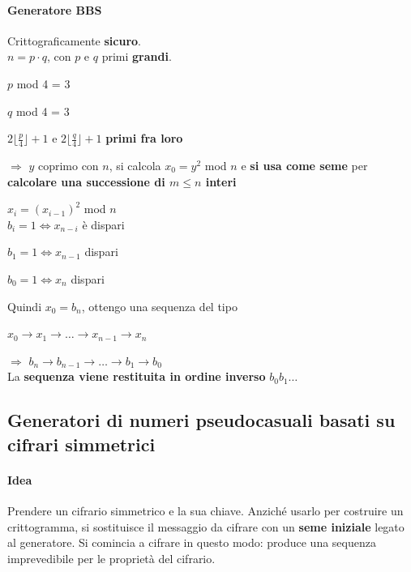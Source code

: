 \documentclass[10pt]{book}
\begin{document}
\paragraph{Generatore BBS} Crittograficamente \textbf{sicuro}.\\
$n = p\cdot q$, con $p$ e $q$ primi \textbf{grandi}.
\begin{list}{}{}
	\item $p$ mod 4 = 3
	\item $q$ mod 4 = 3
	\item $2\lfloor \frac{p}{4}\rfloor + 1$ e $2\lfloor \frac{q}{4}\rfloor + 1$ \textbf{primi fra loro}
	\item[$\Rightarrow$] $y$ coprimo con $n$, si calcola $x_0 = y^2$ mod $n$ e \textbf{si usa come seme} per \textbf{calcolare una successione di $m\leq n$ interi}
	\item $x_i = (x_{i-1})^2$ mod $n$\\
	$b_i = 1 \Leftrightarrow x_{n-i}$ è dispari
	\begin{list}{}{}
		\item $b_1 = 1 \Leftrightarrow x_{n-1}$ dispari
		\item $b_0 = 1 \Leftrightarrow x_{n}$ dispari
	\end{list}
\end{list}
Quindi $x_0 = b_n$, ottengo una sequenza del tipo
\begin{list}{}{}
	\item $x_0 \rightarrow x_1 \rightarrow \ldots \rightarrow x_{n-1} \rightarrow x_n$
	\item[$\Rightarrow$] $b_n \rightarrow b_{n-1} \rightarrow \ldots \rightarrow b_1 \rightarrow b_0$\\
	La \textbf{sequenza viene restituita in ordine inverso} $b_0 b_1\ldots$
\end{list}
\subsection{Generatori di numeri pseudocasuali basati su cifrari simmetrici}
\paragraph{Idea} Prendere un cifrario simmetrico e la sua chiave. Anziché usarlo per costruire un crittogramma, si sostituisce il messaggio da cifrare con un \textbf{seme iniziale} legato al generatore. Si comincia a cifrare in questo modo: produce una sequenza imprevedibile per le proprietà del cifrario.
\end{document}
